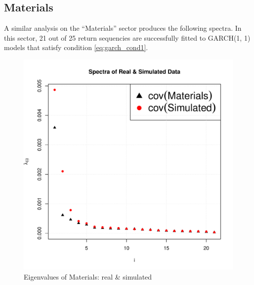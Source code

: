 \documentclass{article}
\begin{document}
\subsection{Materials}
A similar analysis on the ``Materials'' sector produces the following
spectra. In this sector, 21 out of 25 return sequencies are
successfully fitted to GARCH(1, 1) models that satisfy condition
\eqref{eq:garch_cond1}.

\begin{figure}[htb!]
  \centering
  \includegraphics[scale=0.6]{Materials_eigenvalues.pdf}
  \caption{Eigenvalues of Materials: real \& simulated}
  \label{fig:Materials_eigenvalues}
\end{figure}
\end{document}
